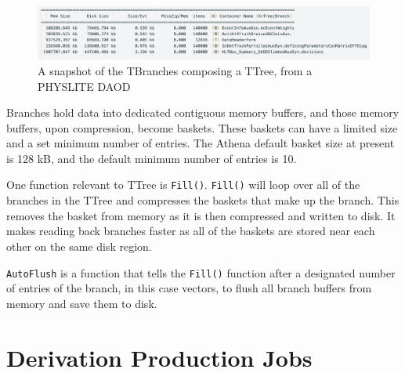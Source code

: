 \begin{figure}[ht]
  \centering
  \includegraphics[width=\textwidth]{content/img/branches_in_TTree.png}
  \caption{A snapshot of the TBranches composing a TTree, from a PHYSLITE DAOD}
  \label{fig:Branches_in_TTree}
\end{figure}

Branches hold data into dedicated contiguous memory buffers, and those memory buffers, upon compression, become baskets.
These baskets can have a limited size and a set minimum number of entries. 
The Athena default basket size at present is 128 kB, and the default minimum number of entries is 10. 

One function relevant to TTree is \verb|Fill()|. 
\verb|Fill()| will loop over all of the branches in the TTree and compresses the baskets that make up the branch.
This removes the basket from memory as it is then compressed and written to disk.
It makes reading back branches faster as all of the baskets are stored near each other on the same disk region.\cite{ROOT_TTree}

\verb|AutoFlush| is a function that tells the \verb|Fill()| function after a designated number of entries of the branch, in this case vectors, to flush all branch buffers from memory and save them to disk. 


\section{Derivation Production Jobs}
 \label{section: ATLASIO_Derivation}

